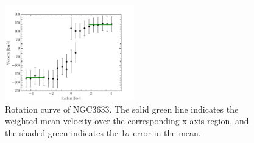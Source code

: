 \documentclass[iop]{emulateapj-rtx4}
\begin{document}
\begin{figure}[b!]
        \centering
        \vspace{0pt}
        \includegraphics[width=0.50\textwidth]{NGC3633_rotation_curve_xphys_helio_vemit.pdf}
        \caption{\small{Rotation curve of NGC3633. The solid green line indicates the weighted mean velocity over the corresponding x-axis region, and the shaded green indicates the 1$\sigma$ error in the mean.}}
        \label{completeness}
\end{figure}
\end{document}
